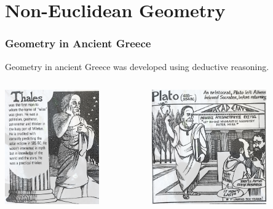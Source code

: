 \documentclass[unicode, 14pt, aspectratio=169]{beamer}
\begin{document}
\section{Non-Euclidean Geometry}
\begin{frame}
  \frametitle{Geometry in Ancient Greece}
  {\large Geometry in ancient Greece was developed using deductive reasoning.}
\begin{columns}
  \begin{column}{0.25\textwidth}
    \begin{center}
      \includegraphics[width=0.7\textwidth]{images/thales.png}
    \end{center}
  \end{column}
  \begin{column}{0.25\textwidth}
    \begin{center}
      \includegraphics[width=0.7\textwidth]{images/plato.png}

\end{center}
\end{column}
\end{columns}
\end{frame}
\end{document}
